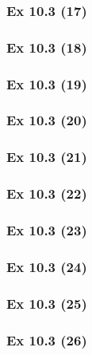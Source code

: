 \subsubsection{Ex 10.3 (17)}\label{sec:Ex_10.3.17}

\subsubsection{Ex 10.3 (18)}\label{sec:Ex_10.3.18}

\subsubsection{Ex 10.3 (19)}\label{sec:Ex_10.3.19}

\subsubsection{Ex 10.3 (20)}\label{sec:Ex_10.3.20}

\newpage		%

\subsubsection{Ex 10.3 (21)}\label{sec:Ex_10.3.21}

\subsubsection{Ex 10.3 (22)}\label{sec:Ex_10.3.22}

\subsubsection{Ex 10.3 (23)}\label{sec:Ex_10.3.23}

\subsubsection{Ex 10.3 (24)}\label{sec:Ex_10.3.24}

\subsubsection{Ex 10.3 (25)}\label{sec:Ex_10.3.25}

\subsubsection{Ex 10.3 (26)}\label{sec:Ex_10.3.26}

